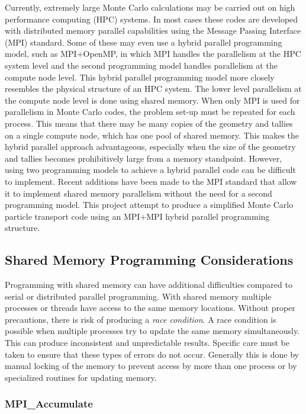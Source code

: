 \documentclass{mc2015}
\begin{document}
Currently, extremely large Monte Carlo calculations may be carried out on
high performance computing (HPC) systems.
In most cases these codes are developed with distributed memory parallel capabilities
using the Message Passing Interface (MPI) standard.
Some of these may even use a hybrid parallel programming model,
such as MPI+OpenMP, in which MPI handles the parallelism at the HPC system level
and the second programming model handles parallelism at the compute node level.
This hybrid parallel programming model more closely resembles
the physical structure of an HPC system.
The lower level parallelism at the compute node level is done using shared memory.
When only MPI is used for parallelism in Monte Carlo codes,
the problem set-up must be repeated for each process.
This means that there may be many copies of the geometry and tallies
on a single compute node, which has one pool of shared memory.
This makes the hybrid parallel approach advantageous,
especially when the size of the geometry and tallies becomes prohibitively large
from a memory standpoint.
However, using two programming models to achieve a hybrid parallel code
can be difficult to implement.
Recent additions have been made to the MPI standard that allow it to implement
shared memory parallelism without the need for a second programming model.
This project attempt to produce a simplified Monte Carlo particle transport code
using an MPI+MPI hybrid parallel programming structure.

\subsection{Shared Memory Programming Considerations}

Programming with shared memory can have additional difficulties
compared to serial or distributed parallel programming.
With shared memory multiple processes or threads have access to the same memory locations.
Without proper precautions, there is risk of producing a \emph{race condition}.
A race condition is possible when multiple processes try to
update the same memory simultaneously.
This can produce inconsistent and unpredictable results.
Specific care must be taken to ensure that these types of errors do not occur.
Generally this is done by manual locking of the memory to prevent access
by more than one process or by specialized routines for updating memory.

\subsubsection{MPI\_Accumulate}
\end{document}
